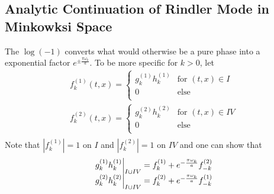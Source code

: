 \documentclass[12pt,a4paper]{article}
\newcommand\restr[2]{{%
  \left.\kern-\nulldelimiterspace %
  #1 %
  \vphantom{\big|} %
  \right|_{#2} %
  }}
\begin{document}
\subsection{Analytic Continuation of Rindler Mode in Minkowksi Space}
The $\log(-1)$ converts what would otherwise be a pure phase into a exponential factor $e^{\pm \frac{\pi \omega_k}{a}}$.  To be more specific for $k>0$, let
\begin{equation}
\begin{array}{l}
f_k^{(1)}(t,x) = \left\{ \begin{array}{ll}
  g_k^{(1)} h_k^{(1)} & \text{for } (t,x) \in I \\
    0 & \text{else} \\ \end{array} \right. \\
f_k^{(2)}(t,x) = \left\{ \begin{array}{ll}
  g_k^{(2)} h_k^{(2)} & \text{for } (t,x) \in IV \\
  0 & \text{else} \\ \end{array} \right. \\
\end{array}
\end{equation}
Note that $\left|f_k^{(1)}\right| = 1$ on $I$ and $\left|f_k^{(2)}\right| = 1$ on $IV$ and one can show that
\begin{equation}
  \begin{array}{l}
    \restr{g_k^{(1)} h_k^{(1)}}{I \cup IV} = f_k^{(1)} + e^{- \frac{\pi \omega_k}{a}} f_{-k}^{(2)} \\
    \restr{g_k^{(2)} h_k^{(2)}}{I \cup IV} = f_k^{(2)} + e^{- \frac{\pi \omega_k}{a}} f_{-k}^{(1)}
  \end{array}
\end{equation}
\end{document}
